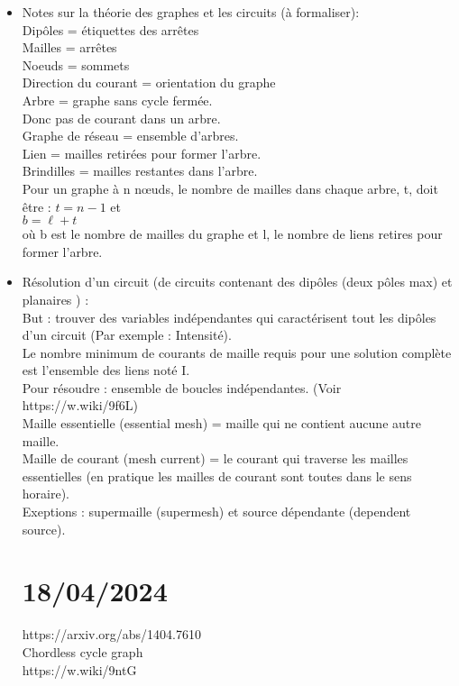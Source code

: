 \documentclass[11pt]{article}
\begin{document}
    \begin{itemize}
	    \item Notes sur la théorie des graphes et les circuits (à formaliser): \\
   Dipôles = étiquettes des arrêtes \\
   Mailles = arrêtes \\
   Noeuds = sommets \\
   Direction du courant = orientation du graphe \\
   
   Arbre = graphe sans cycle fermée. \\
   Donc pas de courant dans un arbre. \\
   Graphe de réseau = ensemble d'arbres. \\
   Lien = mailles retirées pour former l'arbre. \\
   Brindilles = mailles restantes dans l'arbre. \\
   Pour un graphe à n nœuds, le nombre de mailles dans chaque arbre, t, doit être : 
   $\displaystyle t=n-1 $ et \\ 
   $\displaystyle b=\ell +t $ \\
   où b est le nombre de mailles du graphe et l, le nombre de liens 
   retires pour former l'arbre. \\

	\item Résolution d'un circuit (de circuits contenant des dipôles (deux pôles max) et planaires ) : \\
   But : trouver des variables indépendantes qui caractérisent tout les dipôles d'un circuit (Par exemple : Intensité). \\
   Le nombre minimum de courants de maille requis pour une solution complète est l'ensemble des liens noté I. \\
   Pour résoudre : ensemble de boucles indépendantes. (Voir https://w.wiki/9f6L) \\
   Maille essentielle (essential mesh) = maille qui ne contient aucune autre maille. \\
   Maille de courant (mesh current) = le courant qui traverse les mailles essentielles (en pratique les mailles de courant sont toutes dans le sens horaire). \\
   Exeptions : supermaille (supermesh) et source dépendante (dependent source). \\

\section{18/04/2024}
 https://arxiv.org/abs/1404.7610 \\
Chordless cycle graph \\
https://w.wiki/9ntG \\


\end{itemize}
\end{document}
